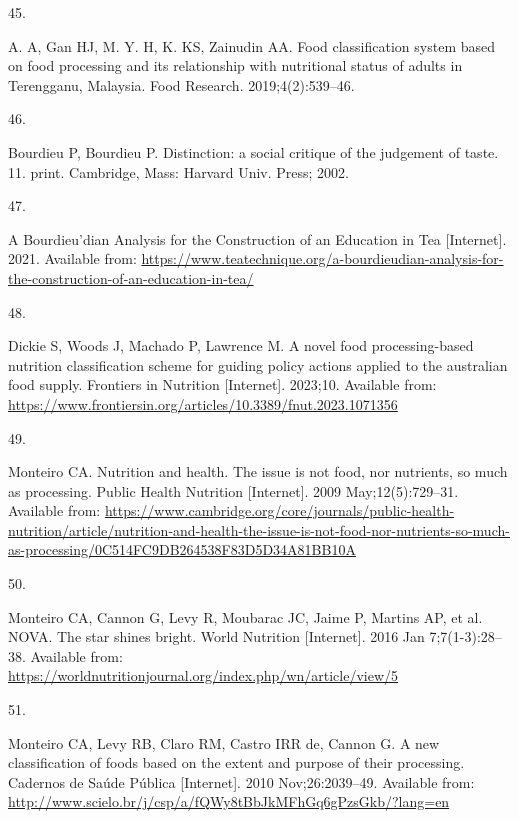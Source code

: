 \documentclass[
]{article}
\newlength{\cslhangindent}
\newlength{\csllabelwidth}
\newlength{\cslentryspacingunit} %
\newenvironment{CSLReferences}[2] %
 {%
  \setlength{\parindent}{0pt}
  \ifodd #1
  \let\oldpar\par
  \def\par{\hangindent=\cslhangindent\oldpar}
  \fi
  \setlength{\parskip}{#2\cslentryspacingunit}
 }%
 {}
\newcommand{\CSLLeftMargin}[1]{\parbox[t]{\csllabelwidth}{#1}}
\newcommand{\CSLRightInline}[1]{\parbox[t]{\linewidth - \csllabelwidth}{#1}\break}
\begin{document}
\begin{CSLReferences}{0}{0}
\leavevmode{}%
\CSLLeftMargin{45. }%
\CSLRightInline{A. A, Gan HJ, M. Y. H, K. KS, Zainudin AA. Food
classification system based on food processing and its relationship with
nutritional status of adults in Terengganu, Malaysia. Food Research.
2019;4(2):539--46. }

\leavevmode{}%
\CSLLeftMargin{46. }%
\CSLRightInline{Bourdieu P, Bourdieu P. Distinction: a social critique
of the judgement of taste. 11. print. Cambridge, Mass: Harvard Univ.
Press; 2002. }

\leavevmode{}%
\CSLLeftMargin{47. }%
\CSLRightInline{A Bourdieu{'}dian Analysis for the Construction of an
Education in Tea {[}Internet{]}. 2021. Available from:
\url{https://www.teatechnique.org/a-bourdieudian-analysis-for-the-construction-of-an-education-in-tea/}}

\leavevmode{}%
\CSLLeftMargin{48. }%
\CSLRightInline{Dickie S, Woods J, Machado P, Lawrence M. A novel food
processing-based nutrition classification scheme for guiding policy
actions applied to the australian food supply. Frontiers in Nutrition
{[}Internet{]}. 2023;10. Available from:
\url{https://www.frontiersin.org/articles/10.3389/fnut.2023.1071356}}

\leavevmode{}%
\CSLLeftMargin{49. }%
\CSLRightInline{Monteiro CA. Nutrition and health. The issue is not
food, nor nutrients, so much as processing. Public Health Nutrition
{[}Internet{]}. 2009 May;12(5):729--31. Available from:
\url{https://www.cambridge.org/core/journals/public-health-nutrition/article/nutrition-and-health-the-issue-is-not-food-nor-nutrients-so-much-as-processing/0C514FC9DB264538F83D5D34A81BB10A}}

\leavevmode{}%
\CSLLeftMargin{50. }%
\CSLRightInline{Monteiro CA, Cannon G, Levy R, Moubarac JC, Jaime P,
Martins AP, et al. NOVA. The star shines bright. World Nutrition
{[}Internet{]}. 2016 Jan 7;7(1-3):28--38. Available from:
\url{https://worldnutritionjournal.org/index.php/wn/article/view/5}}

\leavevmode{}%
\CSLLeftMargin{51. }%
\CSLRightInline{Monteiro CA, Levy RB, Claro RM, Castro IRR de, Cannon G.
A new classification of foods based on the extent and purpose of their
processing. Cadernos de Saúde Pública {[}Internet{]}. 2010
Nov;26:2039--49. Available from:
\url{http://www.scielo.br/j/csp/a/fQWy8tBbJkMFhGq6gPzsGkb/?lang=en}}


\end{CSLReferences}
\end{document}
